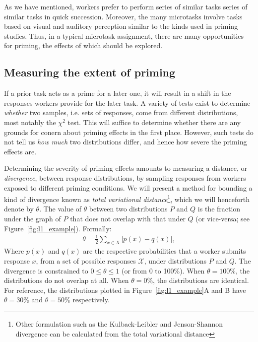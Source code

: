 \documentclass{sigchi}
\begin{document}
As we have mentioned, workers prefer to perform series of similar tasks
series of similar tasks in quick succession.  Moreover, the many 
microtasks involve tasks based on visual and auditory perception 
similar to the kinds used in priming studies.
Thus, in a typical microtask assignment, there are many opportunities for 
priming, the effects of which should be explored.

\subsection{Measuring the extent of priming}
If a prior task acts as a prime for a later one, it will 
result in a shift in the responses workers provide for the later task.
A variety of tests exist to determine \textit{whether} two samples, 
i.e. sets of responses, come from different distributions, 
most notably the $\chi^2$ test.  
This will suffice to determine whether there are any grounds for conern 
about priming effects in the first place.  However, such tests
do not tell us \textit{how much} two distributions differ, and hence
how severe the priming effects are.

Determining the severity of priming effects amounts to measuring a 
distance, or \textit{divergence}, between response distributions, by
sampling responses from workers exposed to different priming conditions.
We will present a method for bounding a kind of divergence known as 
\textit{total variational distance}\footnote{
  Other formulation such as the Kulback-Leibler and 
  Jenson-Shannon divergence can be calculated from the total variational
  distance
}, which we will henceforth denote by $\theta$.
The value of $\theta$ between two distributions $P$ and $Q$ 
is the fraction under the graph of $P$ that does not overlap with that
under $Q$ (or vice-versa; see Figure~\ref{fig:l1_example}).  
Formally:
\begin{align}
	\theta = \frac{1}{2}\sum_{x \in X} \left| p(x) - q(x) \right|,
	\label{eq:theta}
\end{align}
Where $p(x)$ and $q(x)$ are the respective probabilities 
that a worker submits response $x$, from a set of possible responses 
$\mathcal{X}$, under distributions $P$ and $Q$.
The divergence is constrained to 
$0 \leq \theta \leq 1$ (or from 0 to 100\%).
When $\theta = 100\%$, the distributions do not overlap at all.  
When $\theta = 0\%$, the distributions are identical.
For reference, the distributions plotted in 
Figure~\ref{fig:l1_example}A and B have $\theta=30\%$ and $\theta=50\%$ 
respectively.
\end{document}
